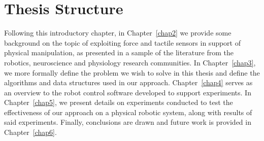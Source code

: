 
\section{Thesis Structure}
Following this introductory chapter, in Chapter~\ref{chap2} we provide some background on the topic of exploiting force and tactile sensors in support of physical manipulation, as presented in a sample of the literature from the robotics, neuroscience and physiology research communities.
In Chapter~\ref{chap3}, we more formally define the problem we wish to solve in this thesis and define the algorithms and data structures used in our approach.
Chapter~\ref{chap4} serves as an overview to the robot control software developed to support experiments.
In Chapter~\ref{chap5}, we present details on experiments conducted to test the effectiveness of our approach on a physical robotic system, along with results of said experiments.
Finally, conclusions are drawn and future work is provided in Chapter~\ref{chap6}.
